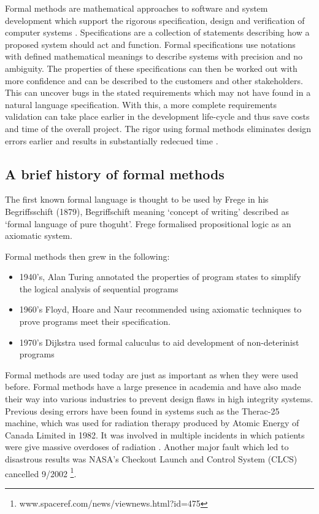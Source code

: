 Formal methods are mathematical approaches to software and system development which support the rigorous specification, design and verification of computer systems \cite{fmeurope}. Specifications are a collection of statements describing how a proposed system should act and function. Formal specifications use notations with defined mathematical meanings to describe systems with precision and no ambiguity. The properties of these specifications can then be worked out with more confidence and can be described to the customers and other stakeholders. This can uncover bugs in the stated requirements which may not have found in a natural language specification. With this, a more complete requirements validation can take place earlier in the development life-cycle and thus save costs and time of the overall project. The rigor using formal methods eliminates design errors earlier and results in substantially redecued time \cite{benefitsofform}. 

\subsection{A brief history of formal methods}

The first known formal language is thought to be used by Frege in his Begriffsschift (1879), Begriffschift meaning `concept of writing' described as `formal language of pure thoguht'. Frege formalised propositional logic as an axiomatic system.

Formal methods then grew in the following:

\begin{itemize}
\item 1940's, Alan Turing annotated the properties of program states to simplify the logical analysis of sequential programs

\item 1960's Floyd, Hoare and Naur recommended using axiomatic techniques to prove programs meet their specification.

\item 1970's Dijkstra used formal caluculus to aid development of non-deterinist programs
\end{itemize}

Formal methods are used today are just as important as when they were used before. Formal methods have a large presence in academia and have also made their way into various industries to prevent design flaws in high integrity systems. Previous desing errors have been found in systems such as the Therac-25 machine, which was used for radiation therapy produced by Atomic Energy of Canada Limited in 1982. It was involved in multiple incidents in which patients were give massive overdoses of radiation \cite{baase2003gift}. Another major fault which led to disastrous results was NASA’s Checkout Launch and Control System (CLCS) cancelled 9/2002 \footnote{www.spaceref.com/news/viewnews.html?id=475}.

